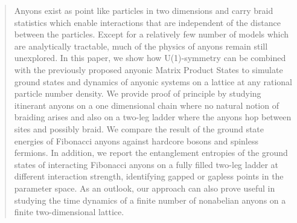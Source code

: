 \documentclass[aps,reprint,superscriptaddress,amsmath,amssymb,amsfonts,prb]{revtex4-1}
\begin{document}
\begin{abstract}  
Anyons exist as point like particles in two dimensions and carry braid statistics which enable interactions that are independent of the distance between the particles. Except for a relatively few number of models which are analytically tractable, much of the physics of anyons remain still unexplored.
In this paper, we show how U(1)-symmetry can be combined with the previously proposed anyonic Matrix Product States to simulate ground states and dynamics of anyonic systems on a lattice at any rational particle number density. We provide proof of principle by studying itinerant anyons on a one dimensional chain where no natural notion of braiding arises and also on a two-leg ladder where the anyons 
hop between sites and possibly braid. We compare the result of the ground state energies of Fibonacci anyons against hardcore bosons and spinless fermions. In addition, we report the entanglement entropies of the ground states of interacting Fibonacci anyons on a fully filled two-leg ladder at different interaction strength, identifying gapped or gapless points in the parameter space. As an outlook, our approach can also prove useful in studying the time dynamics of a finite number of nonabelian anyons on a finite two-dimensional lattice.
\end{abstract}

\maketitle
\end{document}
